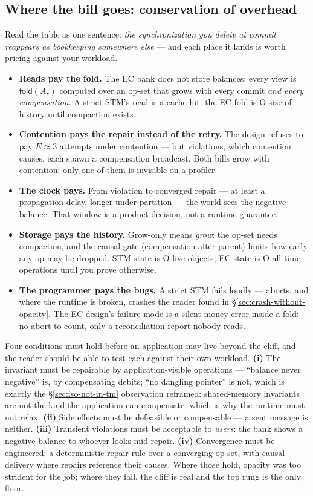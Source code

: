 \subsection*{Where the bill goes: conservation of overhead}

Read the table as one sentence: \emph{the synchronization you delete at
commit reappears as bookkeeping somewhere else} --- and each place it
lands is worth pricing against your workload.

\begin{itemize}
\item \textbf{Reads pay the fold.} The EC bank does not store balances;
every view is $\mathsf{fold}(A_r)$ computed over an op-set that grows with
every commit \emph{and every compensation}. A strict STM's read is a cache
hit; the EC fold is O-size-of-history until compaction exists.
\item \textbf{Contention pays the repair instead of the retry.} The design
refuses to pay $E \approx 3$ attempts under contention --- but violations,
which contention causes, each spawn a compensation broadcast. Both bills
grow with contention; only one of them is invisible on a profiler.
\item \textbf{The clock pays.} From violation to converged repair --- at
least a propagation delay, longer under partition --- the world sees the
negative balance. That window is a product decision, not a runtime
guarantee.
\item \textbf{Storage pays the history.} Grow-only means \emph{grow}: the
op-set needs compaction, and the causal gate (compensation after parent)
limits how early any op may be dropped. STM state is O-live-objects;
EC state is O-all-time-operations until you prove otherwise.
\item \textbf{The programmer pays the bugs.} A strict STM fails loudly ---
aborts, and where the runtime is broken, crashes the reader found in
\S\ref{sec:crash-without-opacity}. The EC design's failure mode is a silent
money error inside a fold: no abort to count, only a reconciliation report
nobody reads.
\end{itemize}

Four conditions must hold before an application may live beyond the cliff,
and the reader should be able to test each against their own workload.
\textbf{(i)} The invariant must be repairable by application-visible
operations --- ``balance never negative'' is, by compensating debits;
``no dangling pointer'' is not, which is exactly the \S\ref{sec:iso-not-in-tm}
observation reframed: shared-memory invariants are not the kind the
application can compensate, which is why the runtime must not relax.
\textbf{(ii)} Side effects must be defeasible or compensable --- a sent
message is neither.
\textbf{(iii)} Transient violations must be acceptable to \emph{users}:
the bank shows a negative balance to whoever looks mid-repair.
\textbf{(iv)} Convergence must be engineered: a deterministic repair rule
over a converging op-set, with causal delivery where repairs reference
their causes. Where those hold, opacity was too strident for the job;
where they fail, the cliff is real and the top rung is the only floor.

